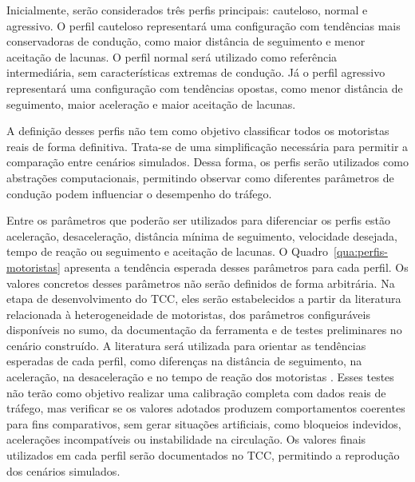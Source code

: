 Inicialmente, serão considerados três perfis principais: cauteloso, normal e agressivo. O perfil cauteloso representará uma configuração com tendências mais conservadoras de condução, como maior distância de seguimento e menor aceitação de lacunas. O perfil normal será utilizado como referência intermediária, sem características extremas de condução. Já o perfil agressivo representará uma configuração com tendências opostas, como menor distância de seguimento, maior aceleração e maior aceitação de lacunas.

A definição desses perfis não tem como objetivo classificar todos os motoristas reais de forma definitiva. Trata-se de uma simplificação necessária para permitir a comparação entre cenários simulados. Dessa forma, os perfis serão utilizados como abstrações computacionais, permitindo observar como diferentes parâmetros de condução podem influenciar o desempenho do tráfego.

Entre os parâmetros que poderão ser utilizados para diferenciar os perfis estão aceleração, desaceleração, distância mínima de seguimento, velocidade desejada, tempo de reação ou seguimento e aceitação de lacunas. O Quadro~\ref{qua:perfis-motoristas} apresenta a tendência esperada desses parâmetros para cada perfil. Os valores concretos desses parâmetros não serão definidos de forma arbitrária. Na etapa de desenvolvimento do TCC, eles serão estabelecidos a partir da literatura relacionada à heterogeneidade de motoristas, dos parâmetros configuráveis disponíveis no \gls{sumo}, da documentação da ferramenta e de testes preliminares no cenário construído. A literatura será utilizada para orientar as tendências esperadas de cada perfil, como diferenças na distância de seguimento, na aceleração, na desaceleração e no tempo de reação dos motoristas \cite{ossen_2011,zhai_2021,mecheva_2022,makridis_2023}. Esses testes não terão como objetivo realizar uma calibração completa com dados reais de tráfego, mas verificar se os valores adotados produzem comportamentos coerentes para fins comparativos, sem gerar situações artificiais, como bloqueios indevidos, acelerações incompatíveis ou instabilidade na circulação. Os valores finais utilizados em cada perfil serão documentados no TCC, permitindo a reprodução dos cenários simulados.


